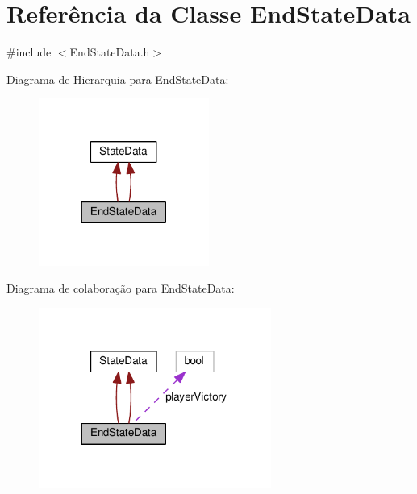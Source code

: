 \hypertarget{classEndStateData}{\section{Referência da Classe End\+State\+Data}
\label{classEndStateData}
}


{\ttfamily \#include $<$End\+State\+Data.\+h$>$}



Diagrama de Hierarquia para End\+State\+Data\+:\nopagebreak
\begin{figure}[H]
\begin{center}
\leavevmode
\includegraphics[width=158pt]{classEndStateData__inherit__graph}
\end{center}
\end{figure}


Diagrama de colaboração para End\+State\+Data\+:
\nopagebreak
\begin{figure}[H]
\begin{center}
\leavevmode
\includegraphics[width=216pt]{classEndStateData__coll__graph}
\end{center}
\end{figure}
